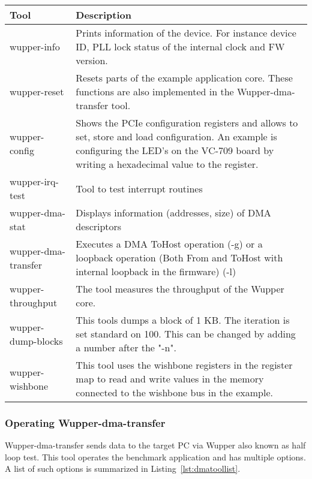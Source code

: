 \begin{center}
	\begin{tabular}{ | l || p{10cm} |}
		\hline
		Tool & Description                       \\ \hline
		
		wupper-info
		&  Prints information of the device. For instance device ID, PLL lock status of the internal clock and FW version.
		\\ \hline
		
		wupper-reset
		&  Resets parts of the example application core. These functions are also implemented in the Wupper-dma-transfer tool.
		\\ \hline
		
		
		wupper-config
		& Shows the PCIe configuration registers and allows to set, store and load configuration. An example is configuring the LED's on the VC-709 board by writing a hexadecimal value to the register.
		\\ \hline
		wupper-irq-test
		&  Tool to test interrupt routines
		\\ \hline
		
		wupper-dma-stat &  Displays information (addresses, size) of DMA descriptors \\ \hline
		wupper-dma-transfer &  Executes a DMA ToHost operation (-g) or a loopback operation (Both From and ToHost with internal loopback in the firmware) (-l) \\ \hline
		wupper-throughput
		&  The tool measures the throughput of the Wupper core.
		\\ \hline
		
		
		wupper-dump-blocks
		&  This tools dumps a block of 1 KB. The iteration is set standard on 100. This can be changed by adding a number after the "-n".
		\\ \hline
		wupper-wishbone
		&  This tool uses the wishbone registers in the register map to read and write values in the memory connected to the wishbone bus in the example.
		\\ \hline
		
	\end{tabular}
\end{center}

\newpage
\subsubsection{Operating Wupper-dma-transfer}

Wupper-dma-transfer sends data to the target PC via Wupper also known as half loop test. This tool operates the benchmark application and has multiple options. A list of such options is summarized in Listing~\ref{lst:dmatoollist}.

